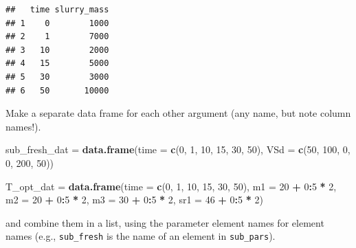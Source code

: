 \documentclass[
]{article}
\newenvironment{Shaded}{\begin{snugshade}}{\end{snugshade}}
\newcommand{\AttributeTok}[1]{\textcolor[rgb]{0.13,0.29,0.53}{#1}}
\newcommand{\DecValTok}[1]{\textcolor[rgb]{0.00,0.00,0.81}{#1}}
\newcommand{\FunctionTok}[1]{\textcolor[rgb]{0.13,0.29,0.53}{\textbf{#1}}}
\newcommand{\NormalTok}[1]{#1}
\newcommand{\OtherTok}[1]{\textcolor[rgb]{0.56,0.35,0.01}{#1}}
\newcommand{\SpecialCharTok}[1]{\textcolor[rgb]{0.81,0.36,0.00}{\textbf{#1}}}
\begin{document}
\begin{verbatim}
##   time slurry_mass
## 1    0        1000
## 2    1        7000
## 3   10        2000
## 4   15        5000
## 5   30        3000
## 6   50       10000
\end{verbatim}

Make a separate data frame for each other argument (any name, but note
column names!).

\begin{Shaded}
\begin{Highlighting}[]
\NormalTok{sub\_fresh\_dat }\OtherTok{=} \FunctionTok{data.frame}\NormalTok{(}\AttributeTok{time =} \FunctionTok{c}\NormalTok{(}\DecValTok{0}\NormalTok{, }\DecValTok{1}\NormalTok{, }\DecValTok{10}\NormalTok{, }\DecValTok{15}\NormalTok{, }\DecValTok{30}\NormalTok{, }\DecValTok{50}\NormalTok{), }
                       \AttributeTok{VSd =} \FunctionTok{c}\NormalTok{(}\DecValTok{50}\NormalTok{, }\DecValTok{100}\NormalTok{, }\DecValTok{0}\NormalTok{, }\DecValTok{0}\NormalTok{, }\DecValTok{200}\NormalTok{, }\DecValTok{50}\NormalTok{))}
\end{Highlighting}
\end{Shaded}

\begin{Shaded}
\begin{Highlighting}[]
\NormalTok{T\_opt\_dat }\OtherTok{=} \FunctionTok{data.frame}\NormalTok{(}\AttributeTok{time =} \FunctionTok{c}\NormalTok{(}\DecValTok{0}\NormalTok{, }\DecValTok{1}\NormalTok{, }\DecValTok{10}\NormalTok{, }\DecValTok{15}\NormalTok{, }\DecValTok{30}\NormalTok{, }\DecValTok{50}\NormalTok{), }
                       \AttributeTok{m1 =} \DecValTok{20} \SpecialCharTok{+} \DecValTok{0}\SpecialCharTok{:}\DecValTok{5} \SpecialCharTok{*} \DecValTok{2}\NormalTok{,}
                       \AttributeTok{m2 =} \DecValTok{20} \SpecialCharTok{+} \DecValTok{0}\SpecialCharTok{:}\DecValTok{5} \SpecialCharTok{*} \DecValTok{2}\NormalTok{,}
                       \AttributeTok{m3 =} \DecValTok{30} \SpecialCharTok{+} \DecValTok{0}\SpecialCharTok{:}\DecValTok{5} \SpecialCharTok{*} \DecValTok{2}\NormalTok{,}
                       \AttributeTok{sr1 =} \DecValTok{46} \SpecialCharTok{+} \DecValTok{0}\SpecialCharTok{:}\DecValTok{5} \SpecialCharTok{*} \DecValTok{2}\NormalTok{)}
\end{Highlighting}
\end{Shaded}

and combine them in a list, using the parameter element names for
element names (e.g., \texttt{sub\_fresh} is the name of an element in
\texttt{sub\_pars}).
\end{document}
